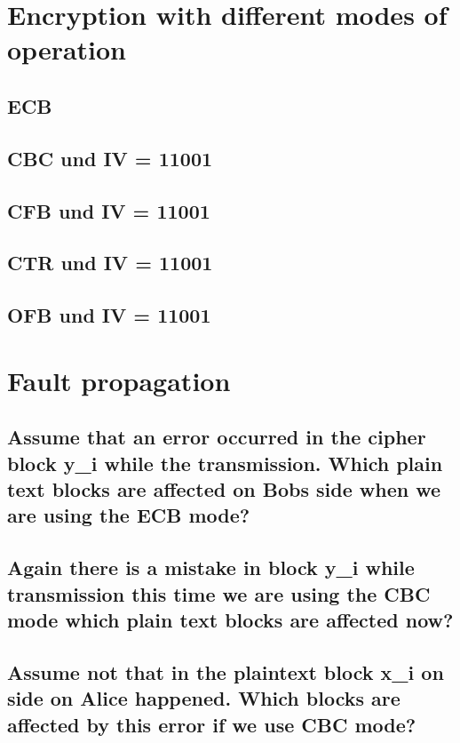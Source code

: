 \section{Encryption with different modes of operation}

\subsection{ECB}
\label{sec:1a}

\subsection{CBC und IV = 11001}
\label{sec:1b}

\subsection{CFB und IV = 11001}
\label{sec:1c}

\subsection{CTR und IV = 11001}
\label{sec:1d}

\subsection{OFB und IV = 11001}
\label{sec:1e}

\section{Fault propagation}

\subsection{Assume that an error occurred in the cipher block y\_i while the transmission. Which plain text blocks are affected on Bobs side when we are using the ECB mode?}
\label{sec:2a}

\subsection{Again there is a mistake in block y\_i while transmission this time we are using the CBC mode which plain text blocks are affected now?}
\label{sec:2b}

\subsection{Assume not that in the plaintext block x\_i on side on Alice happened. Which blocks are affected by this error if we use CBC mode?}
\label{sec:2c}

